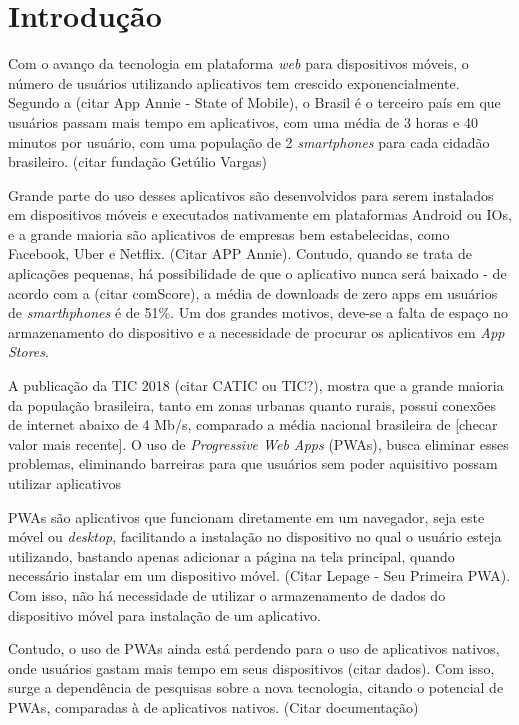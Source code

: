 \chapter{Introdução} \label{cap:metod}

   Com o avanço da tecnologia em plataforma \textit{web} para dispositivos móveis, o número de usuários utilizando aplicativos tem crescido exponencialmente. Segundo a \citeonline{} (citar App Annie - State of Mobile), o Brasil é o terceiro país em que usuários passam mais tempo em aplicativos, com uma média de 3 horas e 40 minutos por usuário, com uma população de 2 \textit{smartphones} para cada cidadão brasileiro. \cite{} (citar fundação Getúlio Vargas)
   
   Grande parte do uso desses aplicativos são desenvolvidos para serem instalados em dispositivos móveis e executados nativamente em plataformas Android ou IOs, e a grande maioria são aplicativos de empresas bem estabelecidas, como Facebook, Uber e Netflix. \cite{} (Citar APP Annie). Contudo, quando se trata de aplicações pequenas, há possibilidade de que o aplicativo nunca será baixado - de acordo com a \citeonline{} (citar comScore), a média de downloads de zero apps em usuários de \textit{smarthphones} é de 51\%. Um dos grandes motivos, deve-se a falta de espaço no armazenamento do dispositivo e a necessidade de procurar os aplicativos em \textit{App Stores}.
   
   A publicação da TIC 2018 (citar CATIC ou TIC?), mostra que a grande maioria da população brasileira, tanto em zonas urbanas quanto rurais, possui conexões de internet abaixo de 4 Mb/s, comparado a média nacional brasileira de [checar valor mais recente]. O uso de \textit{Progressive Web Apps} (PWAs), busca eliminar esses problemas, eliminando barreiras para que usuários sem poder aquisitivo possam utilizar aplicativos 
   
   PWAs são aplicativos que funcionam diretamente em um navegador, seja este móvel ou \textit{desktop}, facilitando a instalação no dispositivo no qual o usuário esteja utilizando, bastando apenas adicionar a página na tela principal, quando necessário instalar em um dispositivo móvel. \cite{} (Citar Lepage - Seu Primeira PWA). Com isso, não há necessidade de utilizar o armazenamento de dados do dispositivo móvel para instalação de um aplicativo. 
   
   Contudo, o uso de PWAs ainda está perdendo para o uso de aplicativos nativos, onde usuários gastam mais tempo em seus dispositivos (citar dados). Com isso, surge a dependência de pesquisas sobre a nova tecnologia, citando o potencial de PWAs, comparadas à de aplicativos nativos. (Citar documentação)
   

